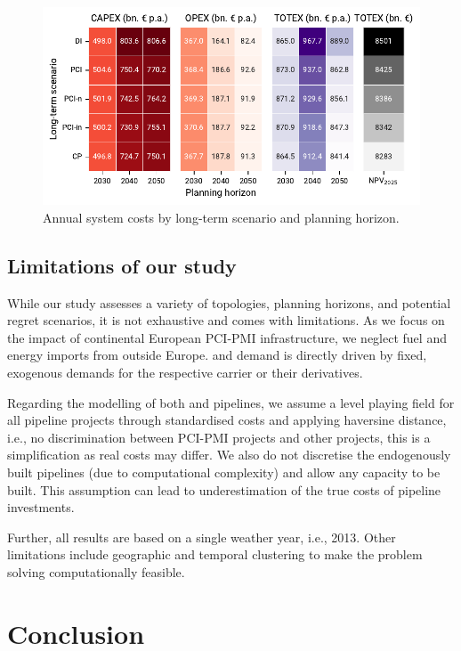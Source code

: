 \documentclass[final,5p,times,twocolumn,sort&compress]{elsarticle}
\begin{document}
\begin{figure}[htbp]
  \centering
  \includegraphics[width=\linewidth]{totex_heatmap.pdf}
  \caption{Annual system costs by long-term scenario and planning horizon.}
  \label{fig:totex_heatmap}
\end{figure}

\subsection{Limitations of our study}
\label{sec:limitations}
While our study assesses a variety of topologies, planning horizons, and potential regret scenarios, it is not exhaustive and comes with limitations.
As we focus on the impact of continental European PCI-PMI infrastructure, we neglect fuel and energy imports from outside Europe.  and  demand is directly driven by fixed, exogenous demands for the respective carrier or their derivatives.

Regarding the modelling of both  and  pipelines, we assume a level playing field for all pipeline projects through standardised costs and applying haversine distance, i.e., no discrimination between PCI-PMI projects and other projects, this is a simplification as real costs may differ. We also do not discretise the endogenously built pipelines (due to computational complexity) and allow any capacity to be built. This assumption can lead to underestimation of the true costs of pipeline investments.

Further, all results are based on a single weather year, i.e., 2013.
Other limitations include geographic and temporal clustering to make the problem solving computationally feasible.
\section{Conclusion}
\label{sec:conclusion}
\end{document}
